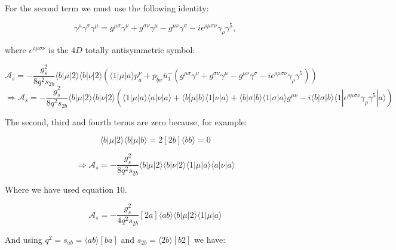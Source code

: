 			For the second term we must use the following identity:

			\begin{equation}
				\gamma^\mu\gamma^\sigma\gamma^\mu=g^{\mu\sigma}\gamma^\nu + g^{\sigma\nu}\gamma^\mu
				- g^{\mu\nu}\gamma^\sigma - i\epsilon^{\rho\mu\sigma\nu}\gamma_\rho\gamma^5,
			\end{equation}

			where $\epsilon^{\rho\mu\sigma\nu}$ is the $4D$ totally antisymmetric symbol:

			\begin{equation}
				\mathcal{A}_s=-\frac{g^2_s}{8q^2s_{2b}}\langle{b}|\mu|2\rangle\langle{b}|\nu|2\rangle
				\left(\langle 1|\mu|a\rangle p_a^\nu + p_{b\sigma}\overline{u}^-_1(g^{\mu\sigma}\gamma^\nu +
				g^{\sigma\nu}\gamma^\mu - g^{\mu\nu}\gamma^\sigma - i\epsilon^{\rho\mu\sigma\nu}\gamma_\rho\gamma^5)\right)
				\end{equation}
				\begin{equation}
				\Rightarrow\mathcal{A}_s=-\frac{g^2_s}{8q^2s_{2b}}\langle{b}|\mu|2\rangle\langle{b}|\nu|2\rangle
				\left(\langle 1|\mu|a\rangle \langle a|\nu|a\rangle\!+\!\langle b|\mu|b\rangle
				\langle 1|\nu|a\rangle\!+\!\langle b|\sigma|b\rangle\langle1|\sigma|a\rangle
				g^{\mu\nu}\!-\!i\langle b|\sigma|b\rangle\langle 1|\epsilon^{\rho\mu\sigma\nu}\gamma_\rho\gamma^5|a\rangle\right)
			\end{equation}

			The second, third and fourth terms are zero because, for example:

			\begin{equation}
				\langle b|\mu|2\rangle\langle b|\mu|b\rangle = 2[2b]\langle b b\rangle = 0
			\end{equation}

			\begin{equation}
				\Rightarrow\mathcal{A}_s=-\frac{g^2_s}{8q^2s_{2b}}
				\langle{b}|\mu|2\rangle\langle{b}|\nu|2\rangle\langle{1}|\mu|a\rangle\langle{a}|\nu|a\rangle
			\end{equation}

			Where we have used equation 10.

			\begin{equation}
			\mathcal{A}_s=-\frac{g^2_s}{4q^2s_{2b}}[2a]\langle ab\rangle\langle{b}|\mu|2\rangle\langle{1}|\mu|a\rangle
			\end{equation}

			And using $q^2=s_{ab}=\langle ab\rangle[ba]$ and $s_{2b}=\langle2b\rangle[b2]$ we have:

